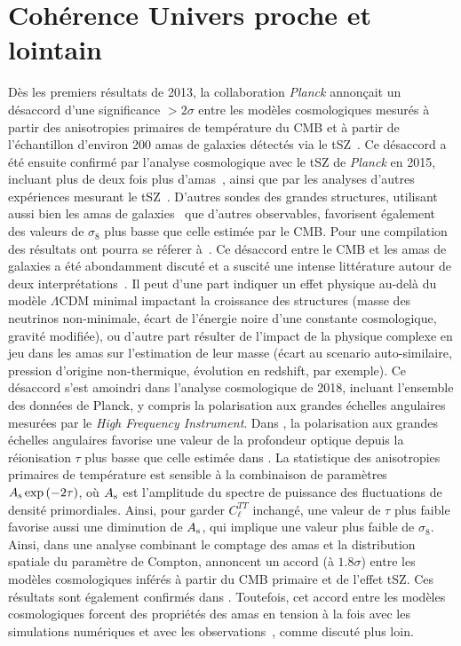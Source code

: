 \section{Cohérence Univers proche et lointain}
\label{se:cosmo_tensions}

Dès les premiers résultats de 2013, la
collaboration \emph{Planck} annonçait un désaccord
d'une significance $>2\sigma$ entre les modèles cosmologiques mesurés
à partir des anisotropies primaires de température du CMB et à partir de
l'échantillon d'environ 200 amas de galaxies détectés via le
tSZ~\citep{Planck_2014_SZ_Cosmo, Planck_2014_ymap}. Ce désaccord a été
ensuite confirmé par l'analyse cosmologique avec le tSZ
de \emph{Planck} en 2015, incluant plus de deux fois plus
d'amas~\citep{Planck_2016_SZ_cosmo, Planck2016_ymap}, ainsi que par
les analyses d'autres expériences mesurant le
tSZ~\citep[\emph{e.g.}][]{Hasselfield2013_ACT_SZ,
deHaan2016}. D'autres sondes des grandes structures, utilisant aussi
bien les amas de galaxies~\citep[\emph{e.g.}][]{Bohringer2014,
Pacaud2018} que d'autres observables, favorisent également des valeurs
de $\sigma_8$ plus basse que celle estimée par le CMB. Pour une
compilation des résultats ont pourra se réferer à~\citet{Salvati2018}.
Ce désaccord entre le CMB et les amas de galaxies a été
abondamment discuté et a suscité une intense littérature autour de
deux interprétations~\citep[voir \emph{e.g.}][pour un
résumé]{Planck_2016_SZ_cosmo, Salvati2018}. Il peut d'une part
indiquer un effet physique au-delà du modèle $\Lambda$CDM minimal
impactant la croissance des structures (masse des neutrinos
non-minimale, écart de l'énergie noire d'une constante cosmologique,
gravité modifiée), ou d'autre part résulter de l'impact de la
physique complexe en jeu dans les amas sur l'estimation de leur masse
(écart au scenario auto-similaire, pression d'origine non-thermique,
évolution en redshift, par exemple). Ce désaccord s'est amoindri dans
l'analyse cosmologique de 2018, incluant l'ensemble des données de
Planck, y compris la polarisation aux grandes échelles angulaires
mesurées par le \emph{High Frequency
Instrument}. Dans \citet{Planck_2018_cosmo}, la polarisation aux
grandes échelles angulaires favorise une valeur de la profondeur
optique depuis la réionisation $\tau$ plus basse que celle estimée
dans \citet{Planck_2016_cosmo}. La statistique des anisotropies
primaires de température est sensible à la combinaison de paramètres
$A_{\rm{s}} \exp{(-2\tau)}$, où $A_{\rm{s}}$ est l'amplitude du spectre
de puissance des fluctuations de densité primordiales. Ainsi, pour
garder $C_\ell^{TT}$ inchangé, une valeur de $\tau$ plus faible
favorise aussi une diminution de $A_{\rm{s}}$, qui implique une valeur
plus faible de $\sigma_8$. Ainsi, dans une analyse combinant le
comptage des amas et la distribution spatiale du paramètre de
Compton, \citet{Salvati2018} annoncent un accord (à $1.8\sigma$) entre
les modèles cosmologiques inférés à partir du CMB primaire et de
l'effet tSZ. Ces résultats sont également confirmés
dans \citet{Zulbedia2019}. Toutefois, cet accord entre les modèles
cosmologiques forcent des propriétés des amas en tension à
la fois avec les simulations numériques et avec les
observations~\citep{Salvati2018}, comme discuté plus loin. 


